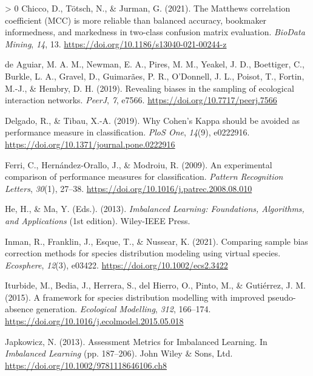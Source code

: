 \documentclass[10pt,oneside]{article}
\newlength{\cslhangindent}
\newenvironment{CSLReferences}[3] %
 {%
  \setlength{\parindent}{0pt}
  \ifodd #1 \everypar{\setlength{\hangindent}{\cslhangindent}}\ignorespaces\fi
  \ifnum #2 > 0
  \setlength{\parskip}{#2\baselineskip}
  \fi
 }%
 {}
\begin{document}
\begin{CSLReferences}{1}{0}
\leavevmode\hypertarget{ref-Chicco2021MatCor}{}%
Chicco, D., Tötsch, N., \& Jurman, G. (2021). The Matthews correlation
coefficient (MCC) is more reliable than balanced accuracy, bookmaker
informedness, and markedness in two-class confusion matrix evaluation.
\emph{BioData Mining}, \emph{14}, 13.
\url{https://doi.org/10.1186/s13040-021-00244-z}

\leavevmode\hypertarget{ref-deAguiar2019RevBia}{}%
de Aguiar, M. A. M., Newman, E. A., Pires, M. M., Yeakel, J. D.,
Boettiger, C., Burkle, L. A., Gravel, D., Guimarães, P. R., O'Donnell,
J. L., Poisot, T., Fortin, M.-J., \& Hembry, D. H. (2019). Revealing
biases in the sampling of ecological interaction networks. \emph{PeerJ},
\emph{7}, e7566. \url{https://doi.org/10.7717/peerj.7566}

\leavevmode\hypertarget{ref-Delgado2019WhyCoh}{}%
Delgado, R., \& Tibau, X.-A. (2019). Why Cohen's Kappa should be avoided
as performance measure in classification. \emph{PloS One}, \emph{14}(9),
e0222916. \url{https://doi.org/10.1371/journal.pone.0222916}

\leavevmode\hypertarget{ref-Ferri2009ExpCom}{}%
Ferri, C., Hernández-Orallo, J., \& Modroiu, R. (2009). An experimental
comparison of performance measures for classification. \emph{Pattern
Recognition Letters}, \emph{30}(1), 27--38.
\url{https://doi.org/10.1016/j.patrec.2008.08.010}

\leavevmode\hypertarget{ref-He2013ImbLea}{}%
He, H., \& Ma, Y. (Eds.). (2013). \emph{Imbalanced Learning:
Foundations, Algorithms, and Applications} (1st edition). Wiley-IEEE
Press.

\leavevmode\hypertarget{ref-Inman2021ComSam}{}%
Inman, R., Franklin, J., Esque, T., \& Nussear, K. (2021). Comparing
sample bias correction methods for species distribution modeling using
virtual species. \emph{Ecosphere}, \emph{12}(3), e03422.
\url{https://doi.org/10.1002/ecs2.3422}

\leavevmode\hypertarget{ref-Iturbide2015FraSpe}{}%
Iturbide, M., Bedia, J., Herrera, S., del Hierro, O., Pinto, M., \&
Gutiérrez, J. M. (2015). A framework for species distribution modelling
with improved pseudo-absence generation. \emph{Ecological Modelling},
\emph{312}, 166--174.
\url{https://doi.org/10.1016/j.ecolmodel.2015.05.018}

\leavevmode\hypertarget{ref-Japkowicz2013AssMet}{}%
Japkowicz, N. (2013). Assessment Metrics for Imbalanced Learning. In
\emph{Imbalanced Learning} (pp. 187--206). John Wiley \& Sons, Ltd.
\url{https://doi.org/10.1002/9781118646106.ch8}


\end{CSLReferences}
\end{document}
